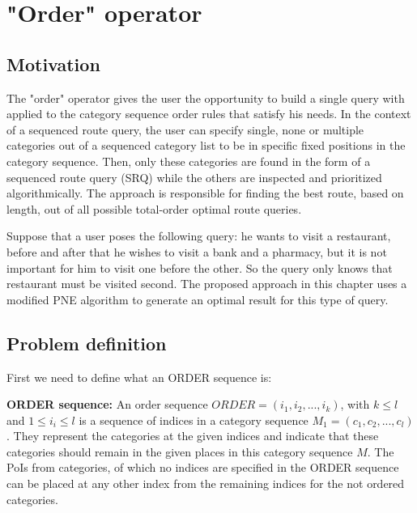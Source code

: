 


\section{"Order" operator}

\subsection{Motivation}
\label{sec:motORDER}
The "order" operator gives the user the opportunity to build a single query with applied to the category sequence order rules that satisfy his needs. In the context of a sequenced route query, the user can specify single, none or multiple categories out of a sequenced category list to be in specific fixed positions in the category sequence. Then, only these categories are found in the form of a sequenced route query (SRQ) while the others are inspected and prioritized algorithmically. The approach is responsible for finding the best route, based on length, out of all possible total-order optimal route queries.

Suppose that a user poses the following query: he wants to visit a restaurant, before and after that he wishes to visit a bank and a pharmacy, but it is not important for him to visit one before the other. So the query only knows that restaurant must be visited second. The proposed approach in this chapter uses a modified PNE algorithm to generate an optimal result for this type of query.

\subsection{Problem definition} 
\label{sec:problemOrder}
First we need to define what an ORDER sequence is:

\textbf{ORDER sequence:} An order sequence $ORDER = (i_1, i_2, ..., i_k)$, with $k \leq l$ and $1 \leq i_i \leq l$ is a sequence of indices in a category sequence $M_1 = (c_1, c_2, ..., c_l)$. They represent the categories at the given indices and indicate that these categories should remain in the given places in this category sequence $M$. The PoIs from categories, of which no indices are specified in the ORDER sequence can be placed at any other index from the remaining indices for the not ordered categories.

